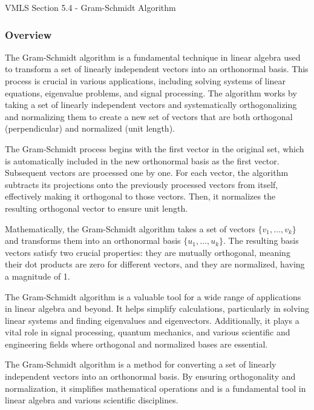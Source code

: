 \begin{notes}{VMLS Section 5.4 - Gram-Schmidt Algorithm}
    \subsubsection*{Overview}

    The Gram-Schmidt algorithm is a fundamental technique in linear algebra used to transform a set of linearly independent vectors into an orthonormal basis. This process is crucial in various applications, 
    including solving systems of linear equations, eigenvalue problems, and signal processing. The algorithm works by taking a set of linearly independent vectors and systematically orthogonalizing and 
    normalizing them to create a new set of vectors that are both orthogonal (perpendicular) and normalized (unit length).

    The Gram-Schmidt process begins with the first vector in the original set, which is automatically included in the new orthonormal basis as the first vector. Subsequent vectors are processed one by one. 
    For each vector, the algorithm subtracts its projections onto the previously processed vectors from itself, effectively making it orthogonal to those vectors. Then, it normalizes the resulting orthogonal 
    vector to ensure unit length.
    
    Mathematically, the Gram-Schmidt algorithm takes a set of vectors $\{v_{1}, \dots , v_{k}\}$ and transforms them into an orthonormal basis $\{u_{1}, \dots, u_{k}\}$. The resulting basis vectors satisfy 
    two crucial properties: they are mutually orthogonal, meaning their dot products are zero for different vectors, and they are normalized, having a magnitude of 1.
    
    The Gram-Schmidt algorithm is a valuable tool for a wide range of applications in linear algebra and beyond. It helps simplify calculations, particularly in solving linear systems and finding eigenvalues 
    and eigenvectors. Additionally, it plays a vital role in signal processing, quantum mechanics, and various scientific and engineering fields where orthogonal and normalized bases are essential.
    
    The Gram-Schmidt algorithm is a method for converting a set of linearly independent vectors into an orthonormal basis. By ensuring orthogonality and normalization, it simplifies mathematical operations 
    and is a fundamental tool in linear algebra and various scientific disciplines.


\end{notes}
